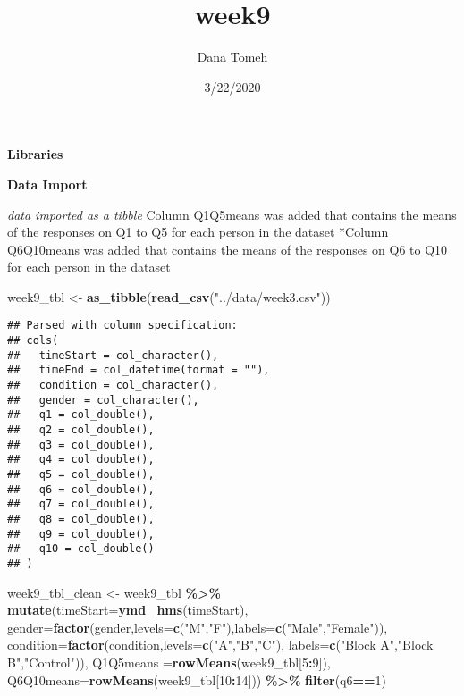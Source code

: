 \documentclass[
]{article}
\title{week9}
\author{Dana Tomeh}
\date{3/22/2020}
\newenvironment{Shaded}{\begin{snugshade}}{\end{snugshade}}
\newcommand{\DataTypeTok}[1]{\textcolor[rgb]{0.13,0.29,0.53}{#1}}
\newcommand{\DecValTok}[1]{\textcolor[rgb]{0.00,0.00,0.81}{#1}}
\newcommand{\KeywordTok}[1]{\textcolor[rgb]{0.13,0.29,0.53}{\textbf{#1}}}
\newcommand{\NormalTok}[1]{#1}
\newcommand{\OperatorTok}[1]{\textcolor[rgb]{0.81,0.36,0.00}{\textbf{#1}}}
\newcommand{\StringTok}[1]{\textcolor[rgb]{0.31,0.60,0.02}{#1}}
\begin{document}
\maketitle

\textbf{Libraries}

\textbf{Data Import}

\emph{data imported as a tibble }Column Q1Q5means was added that
contains the means of the responses on Q1 to Q5 for each person in the
dataset *Column Q6Q10means was added that contains the means of the
responses on Q6 to Q10 for each person in the dataset

\begin{Shaded}
\begin{Highlighting}[]
\NormalTok{week9\_tbl \textless{}{-}}\StringTok{ }\KeywordTok{as\_tibble}\NormalTok{(}\KeywordTok{read\_csv}\NormalTok{(}\StringTok{"../data/week3.csv"}\NormalTok{))}
\end{Highlighting}
\end{Shaded}

\begin{verbatim}
## Parsed with column specification:
## cols(
##   timeStart = col_character(),
##   timeEnd = col_datetime(format = ""),
##   condition = col_character(),
##   gender = col_character(),
##   q1 = col_double(),
##   q2 = col_double(),
##   q3 = col_double(),
##   q4 = col_double(),
##   q5 = col_double(),
##   q6 = col_double(),
##   q7 = col_double(),
##   q8 = col_double(),
##   q9 = col_double(),
##   q10 = col_double()
## )
\end{verbatim}

\begin{Shaded}
\begin{Highlighting}[]
\NormalTok{week9\_tbl\_clean \textless{}{-}}\StringTok{ }\NormalTok{week9\_tbl }\OperatorTok{\%\textgreater{}\%}
\StringTok{  }\KeywordTok{mutate}\NormalTok{(}\DataTypeTok{timeStart=}\KeywordTok{ymd\_hms}\NormalTok{(timeStart),}
         \DataTypeTok{gender=}\KeywordTok{factor}\NormalTok{(gender,}\DataTypeTok{levels=}\KeywordTok{c}\NormalTok{(}\StringTok{"M"}\NormalTok{,}\StringTok{"F"}\NormalTok{),}\DataTypeTok{labels=}\KeywordTok{c}\NormalTok{(}\StringTok{"Male"}\NormalTok{,}\StringTok{"Female"}\NormalTok{)),}
         \DataTypeTok{condition=}\KeywordTok{factor}\NormalTok{(condition,}\DataTypeTok{levels=}\KeywordTok{c}\NormalTok{(}\StringTok{"A"}\NormalTok{,}\StringTok{"B"}\NormalTok{,}\StringTok{"C"}\NormalTok{), }\DataTypeTok{labels=}\KeywordTok{c}\NormalTok{(}\StringTok{"Block A"}\NormalTok{,}\StringTok{"Block B"}\NormalTok{,}\StringTok{"Control"}\NormalTok{)),}
         \DataTypeTok{Q1Q5means =}\KeywordTok{rowMeans}\NormalTok{(week9\_tbl[}\DecValTok{5}\OperatorTok{:}\DecValTok{9}\NormalTok{]),}
         \DataTypeTok{Q6Q10means=}\KeywordTok{rowMeans}\NormalTok{(week9\_tbl[}\DecValTok{10}\OperatorTok{:}\DecValTok{14}\NormalTok{])) }\OperatorTok{\%\textgreater{}\%}
\StringTok{  }\KeywordTok{filter}\NormalTok{(q6}\OperatorTok{==}\DecValTok{1}\NormalTok{)}
\end{Highlighting}
\end{Shaded}
\end{document}
